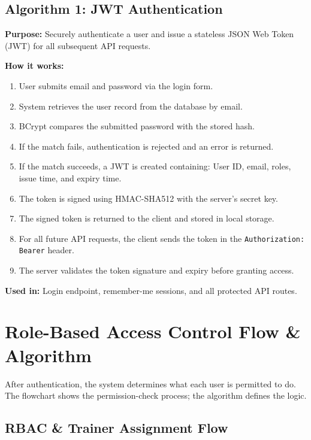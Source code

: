 \documentclass[
  12pt,
  a4paperpaper,
]{report}
\begin{document}
\subsection{Algorithm 1: JWT Authentication}\label{algo-jwt}

\noindent\textbf{Purpose:} Securely authenticate a user and issue a stateless JSON Web Token (JWT) for all subsequent API requests.

\smallskip
\noindent\textbf{How it works:}
\begin{enumerate}
  \item User submits email and password via the login form.
  \item System retrieves the user record from the database by email.
  \item BCrypt compares the submitted password with the stored hash.
  \item If the match fails, authentication is rejected and an error is returned.
  \item If the match succeeds, a JWT is created containing: User ID, email, roles, issue time, and expiry time.
  \item The token is signed using HMAC-SHA512 with the server's secret key.
  \item The signed token is returned to the client and stored in local storage.
  \item For all future API requests, the client sends the token in the \texttt{Authorization: Bearer} header.
  \item The server validates the token signature and expiry before granting access.
\end{enumerate}

\noindent\textbf{Used in:} Login endpoint, remember-me sessions, and all protected API routes.

\section{Role-Based Access Control Flow \& Algorithm}\label{sec-rbac}

\noindent
After authentication, the system determines what each user is permitted to do. The flowchart shows the permission-check process; the algorithm defines the logic.

\subsection{RBAC \& Trainer Assignment Flow}\label{wf-rbac}
\end{document}
